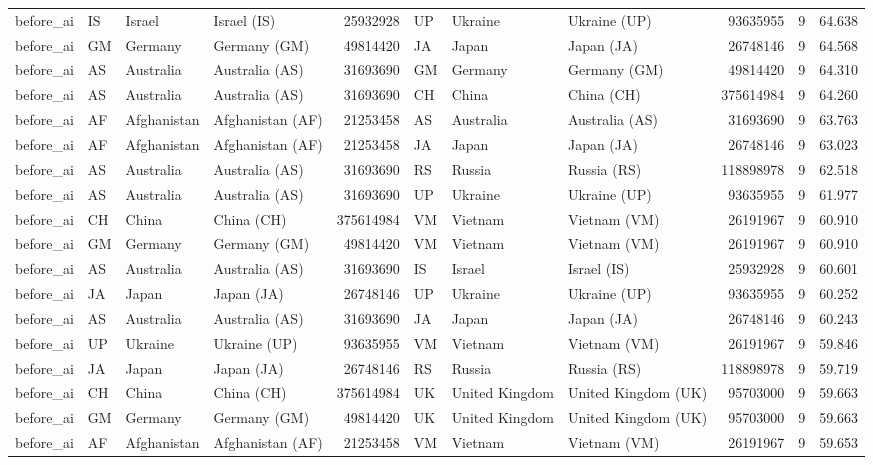 \begin{tabular}{llllrlllrrr}
before\_ai & IS & Israel & Israel (IS) & 25932928 & UP & Ukraine & Ukraine (UP) & 93635955 & 9 & 64.638 \\
before\_ai & GM & Germany & Germany (GM) & 49814420 & JA & Japan & Japan (JA) & 26748146 & 9 & 64.568 \\
before\_ai & AS & Australia & Australia (AS) & 31693690 & GM & Germany & Germany (GM) & 49814420 & 9 & 64.310 \\
before\_ai & AS & Australia & Australia (AS) & 31693690 & CH & China & China (CH) & 375614984 & 9 & 64.260 \\
before\_ai & AF & Afghanistan & Afghanistan (AF) & 21253458 & AS & Australia & Australia (AS) & 31693690 & 9 & 63.763 \\
before\_ai & AF & Afghanistan & Afghanistan (AF) & 21253458 & JA & Japan & Japan (JA) & 26748146 & 9 & 63.023 \\
before\_ai & AS & Australia & Australia (AS) & 31693690 & RS & Russia & Russia (RS) & 118898978 & 9 & 62.518 \\
before\_ai & AS & Australia & Australia (AS) & 31693690 & UP & Ukraine & Ukraine (UP) & 93635955 & 9 & 61.977 \\
before\_ai & CH & China & China (CH) & 375614984 & VM & Vietnam & Vietnam (VM) & 26191967 & 9 & 60.910 \\
before\_ai & GM & Germany & Germany (GM) & 49814420 & VM & Vietnam & Vietnam (VM) & 26191967 & 9 & 60.910 \\
before\_ai & AS & Australia & Australia (AS) & 31693690 & IS & Israel & Israel (IS) & 25932928 & 9 & 60.601 \\
before\_ai & JA & Japan & Japan (JA) & 26748146 & UP & Ukraine & Ukraine (UP) & 93635955 & 9 & 60.252 \\
before\_ai & AS & Australia & Australia (AS) & 31693690 & JA & Japan & Japan (JA) & 26748146 & 9 & 60.243 \\
before\_ai & UP & Ukraine & Ukraine (UP) & 93635955 & VM & Vietnam & Vietnam (VM) & 26191967 & 9 & 59.846 \\
before\_ai & JA & Japan & Japan (JA) & 26748146 & RS & Russia & Russia (RS) & 118898978 & 9 & 59.719 \\
before\_ai & CH & China & China (CH) & 375614984 & UK & United Kingdom & United Kingdom (UK) & 95703000 & 9 & 59.663 \\
before\_ai & GM & Germany & Germany (GM) & 49814420 & UK & United Kingdom & United Kingdom (UK) & 95703000 & 9 & 59.663 \\
before\_ai & AF & Afghanistan & Afghanistan (AF) & 21253458 & VM & Vietnam & Vietnam (VM) & 26191967 & 9 & 59.653 \\

\end{tabular}
